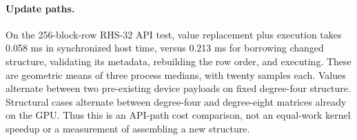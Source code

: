 \paragraph{Update paths.} On the 256-block-row RHS-32 API test, value replacement plus execution takes 0.058 ms in synchronized host time, versus 0.213 ms for borrowing changed structure, validating its metadata, rebuilding the row order, and executing. These are geometric means of three process medians, with twenty samples each. Values alternate between two pre-existing device payloads on fixed degree-four structure. Structural cases alternate between degree-four and degree-eight matrices already on the GPU. Thus this is an API-path cost comparison, not an equal-work kernel speedup or a measurement of assembling a new structure.

